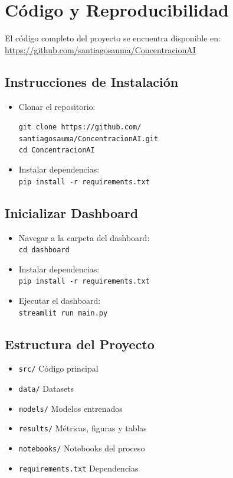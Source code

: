 \documentclass[conference]{IEEEtran}
\begin{document}
\section{Código y Reproducibilidad}
El código completo del proyecto se encuentra disponible en:\\
\url{https://github.com/santiagosauma/ConcentracionAI}

\subsection*{Instrucciones de Instalación}
\begin{itemize}
    \item Clonar el repositorio:\\
    \begin{small}
    \texttt{git clone https://github.com/}\\
    \texttt{santiagosauma/ConcentracionAI.git}\\
    \texttt{cd ConcentracionAI}
    \end{small}
    
    \item Instalar dependencias:\\
    \texttt{pip install -r requirements.txt}
\end{itemize}

\subsection*{Inicializar Dashboard}
\begin{itemize}
    \item Navegar a la carpeta del dashboard:\\
    \texttt{cd dashboard}
    
    \item Instalar dependencias:\\
    \texttt{pip install -r requirements.txt}
    
    \item Ejecutar el dashboard:\\
    \texttt{streamlit run main.py}
\end{itemize}

\subsection*{Estructura del Proyecto}
\begin{itemize}
    \item \texttt{src/} \hfill Código principal
    \item \texttt{data/} \hfill Datasets
    \item \texttt{models/} \hfill Modelos entrenados
    \item \texttt{results/} \hfill Métricas, figuras y tablas
    \item \texttt{notebooks/} \hfill Notebooks del proceso
    \item \texttt{requirements.txt} \hfill Dependencias
\end{itemize}
\end{document}
